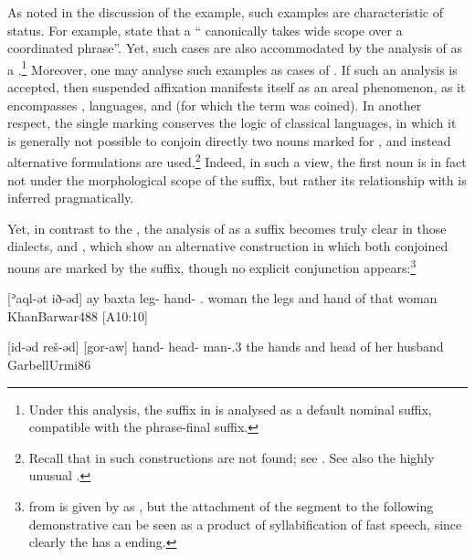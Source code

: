 As noted in the discussion of the  example, such examples are characteristic of  status. For example, \citet[134]{SpencerLuisCanonical} state that a \enquote{ canonically takes wide scope over a coordinated phrase}. Yet, such cases are also accommodated by the analysis of \ed as a .\footnote{Under this analysis, the \free* suffix  in  is analysed as a default nominal suffix, compatible with the phrase-final \cst* suffix.} Moreover, one may analyse such examples as  cases of . If such an analysis is accepted, then suspended affixation manifests itself as an areal phenomenon, as it encompasses ,  languages, and  (for which the term was coined). In another respect, the single \cst* marking conserves the  logic of classical  languages, in which it is generally not possible to conjoin directly two nouns  marked for \cst*, and instead alternative formulations are used.\footnote{Recall that in \MHeb such constructions are not found; see . See also the highly unusual \Syr {}.}  Indeed, in such a view, the first noun  is in fact not under the morphological scope of the \ed suffix, but rather its relationship with  is inferred pragmatically.    

Yet, in contrast to the  \ez*, the analysis of \ed as a suffix becomes truly clear in those dialects, \Barw and \JUrm, which show an alternative construction in which both  conjoined nouns are marked by the \ed suffix, though no explicit conjunction appears:\footnote{ from \Barw is given by \citeauthor{KhanBarwar} as , but the attachment of the  segment to the following demonstrative can be seen as a product of syllabification of fast speech, since clearly the  has a \cst* ending.} 

{[ʾaql-ət ið-əd] ay baxta}
{leg-\cst{} hand-\cst{} .\fem{} woman}
{the legs and hand of that woman}
{KhanBarwar}{488 {[A10:10]}}

{[id-əd reš-əd] [gor-aw]}
{hand-\cst{} head-\cst{} man-\poss.3\fem}
{the hands and head of her husband}
{GarbellUrmi}{86}

